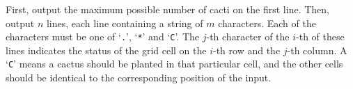 First, output the maximum possible number of cacti on the
first line. Then, output $n$ lines, each line containing a string of 
$m$ characters.
Each of the characters must be one of `\verb+.+', `\verb+*+' and `\verb+C+'.
The $j$-th character of the $i$-th of these lines indicates the status of
the grid cell on the $i$-th row and the $j$-th column.
A `\verb+C+' means a cactus should be planted in that particular cell,
and the other cells should be identical to the corresponding position of the 
input.
